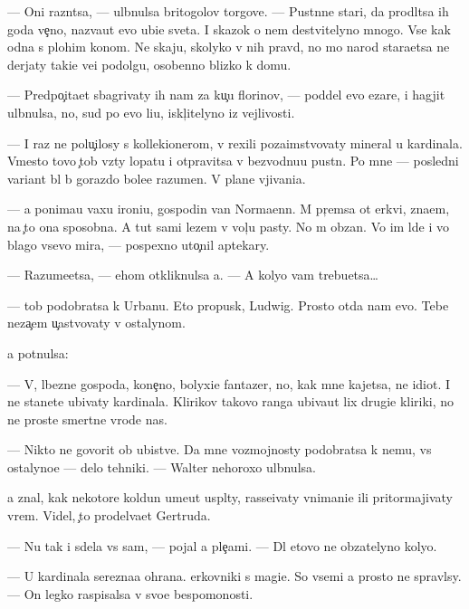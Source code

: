 \documentclass[10pt]{book}
\begin{document}
— Oni razn{\ia}tsa, — ul{\yi}bnulsa britogolov{\yi}{\y} torgove{\q}. — Pust{\yi}nn{\yi}{\y}e star{\q}i, da prodl{\ia}tsa ih goda ve{\c}no, naz{\yi}va{\y}ut {\y}evo ubi{\y}{\q}e{\y} sveta. I skazok o nem de{\y}stvitelyno mnogo. Vse kak odna s plohim kon{\q}om. Ne skaju, skolyko v nih pravd{\yi}, no mo{\y} narod stara{\y}etsa ne derjaty taki{\y}e ve{\x}i podolgu, osobenno blizko k domu.

— Predpo{\c}ita{\y}et sbagrivaty ih nam za ku{\c}u florinov, — poddel {\y}evo {\C}ezare, i hagjit ul{\yi}bnulsa, no, sud{\ia} po {\y}evo li{\q}u, iskl{\iu}{\c}itelyno iz vejlivosti.

— I raz ne polu{\c}ilosy s kollek{\q}ionerom, v{\yi} rexili poza{\y}imstvovaty mineral u kardinala. Vmesto tovo {\c}tob{\yi} vz{\ia}ty lopatu i otpravitsa v bezvodnu{\y}u pust{\yi}n{\iu}. Po mne — posledni{\y} variant b{\yi}l b{\yi} gorazdo bole{\y}e razumen. V plane v{\yi}jivani{\y}a.

— {\Y}a ponima{\y}u vaxu ironi{\y}u, gospodin van Normaenn. M{\yi} pr{\ia}{\c}emsa ot {\Q}erkvi, zna{\y}em, na {\c}to ona sposobna. A tut sami lezem v vol{\c}{\y}u pasty. No m{\yi} ob{\ia}zan{\yi}. Vo im{\ia} l{\iu}de{\y} i vo blago vsevo mira, — pospexno uto{\c}nil aptekary.

— Razume{\y}etsa, — ehom otkliknulsa {\y}a. — A koly{\q}o vam trebu{\y}etsa…

— {\C}tob{\yi} podobratsa k Urbanu. Eto propusk, Ludwig. Prosto otda{\y} nam {\y}evo. Tebe neza{\c}em u{\c}astvovaty v ostalynom.

{\Y}a pot{\ia}nulsa:

— V{\yi}, l{\iu}bezn{\yi}{\y}e gospoda, kone{\c}no, bolyxi{\y}e fantazer{\yi}, no, kak mne kajetsa, ne idiot{\yi}. I ne stanete ubivaty kardinala. Klirikov takovo ranga ubiva{\y}ut lix drugi{\y}e kliriki, no ne prost{\yi}{\y}e smertn{\yi}{\y}e vrode nas.

— Nikto ne govorit ob ubi{\y}stve. Da{\y} mne vozmojnosty podobratsa k nemu, vs{\e} ostalyno{\y}e — delo tehniki. — Walter nehoroxo ul{\yi}bnulsa.

{\Y}a znal, kak nekotor{\yi}{\y}e koldun{\yi} ume{\y}ut us{\yi}pl{\ia}ty, rasse{\y}ivaty vnimani{\y}e ili pritormajivaty vrem{\ia}. Videl, {\c}to prodel{\yi}va{\y}et Gertruda.

— Nu tak i sdela{\y} vs{\e} sam, — pojal {\y}a ple{\c}ami. — Dl{\ia} etovo ne ob{\ia}zatelyno koly{\q}o.

— U kardinala ser{\y}ezna{\y}a ohrana. {\Q}erkovniki s magi{\y}e{\y}. So vsemi {\y}a prosto ne spravl{\iu}sy. — On legko raspisalsa v svo{\y}e{\y} bespomo{\x}nosti.
\end{document}

